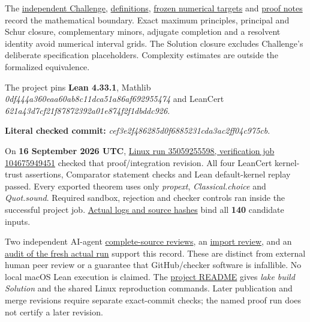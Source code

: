 \documentclass[11pt,a4paper]{article}
\begin{document}
The
\href{https://github.com/ajt60gaibb/OpenProblemsInNLA/blob/main/intervals-and-absolute-value-equations/IV-03/lean/Challenge.lean}{independent
Challenge},
\href{https://github.com/ajt60gaibb/OpenProblemsInNLA/blob/main/intervals-and-absolute-value-equations/IV-03/lean/NLA/IV03/Definitions.lean}{definitions},
\href{https://github.com/ajt60gaibb/OpenProblemsInNLA/blob/main/intervals-and-absolute-value-equations/IV-03/lean/NUMERICAL_TARGETS.md}{frozen
numerical targets} and
\href{https://github.com/ajt60gaibb/OpenProblemsInNLA/blob/main/intervals-and-absolute-value-equations/IV-03/lean/PROOF_NOTES.md}{proof
notes} record the mathematical boundary. Exact maximum principles,
principal and Schur closure, complementary minors, adjugate completion
and a resolvent identity avoid numerical interval grids. The Solution
closure excludes Challenge's deliberate specification placeholders.
Complexity estimates are outside the formalized equivalence.

The project pins \textbf{Lean 4.33.1}, Mathlib
\textit{0df444a360eaa60ab8c11dca51a86af692955474} and LeanCert
\textit{621a43d7cf21f87872392a01e874f2f1dbddc926}.

\textbf{Literal checked commit:}
\textit{cef3e2f486285d0f6885231cda3ac2ff04c975cb}.

On \textbf{16 September 2026 UTC},
\href{https://github.com/sgstepaniants/OpenProblemsInNLA/actions/runs/35059255598/job/104675949451}{Linux
run 35059255598, verification job 104675949451} checked that
proof/integration revision. All four LeanCert kernel-trust assertions,
Comparator statement checks and Lean default-kernel replay passed. Every
exported theorem uses only \textit{propext}, \textit{Classical.choice}
and \textit{Quot.sound}. Required sandbox, rejection and checker
controls ran inside the successful project job.
\href{https://github.com/ajt60gaibb/OpenProblemsInNLA/blob/main/intervals-and-absolute-value-equations/IV-03/lean/verification/linux-2026-09-16/README.md}{Actual
logs and source hashes} bind all \textbf{140} candidate inputs.

Two independent AI-agent
\href{https://github.com/ajt60gaibb/OpenProblemsInNLA/blob/main/intervals-and-absolute-value-equations/IV-03/lean/reviews/final/README.md}{complete-source
reviews}, an
\href{https://github.com/ajt60gaibb/OpenProblemsInNLA/blob/main/intervals-and-absolute-value-equations/IV-03/lean/reviews/campaign/import-review/REVIEW.md}{import
review}, and an
\href{https://github.com/ajt60gaibb/OpenProblemsInNLA/blob/main/intervals-and-absolute-value-equations/IV-03/lean/verification/linux-2026-09-16/mi04-independent/REVIEW.md}{audit
of the fresh actual run} support this record. These are distinct from
external human peer review or a guarantee that GitHub/checker software
is infallible. No local macOS Lean execution is claimed. The
\href{https://github.com/ajt60gaibb/OpenProblemsInNLA/blob/main/intervals-and-absolute-value-equations/IV-03/lean/README.md}{project
README} gives \textit{lake build Solution} and the shared Linux
reproduction commands. Later publication and merge revisions require
separate exact-commit checks; the named proof run does not certify a
later revision.
\end{document}
